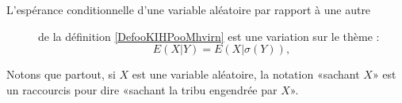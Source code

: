 \begin{description}
\item[L'espérance conditionnelle d'une variable aléatoire par rapport à une autre] de la définition \ref{DefooKIHPooMhvirn} est une variation sur le thème :
\begin{equation}
    E(X|Y)=E(X|\sigma(Y)),
\end{equation}


\end{description}

Notons que partout, si \( X\) est une variable aléatoire, la notation «sachant \( X\)» est un raccourcis pour dire «sachant la tribu engendrée par \( X\)».
